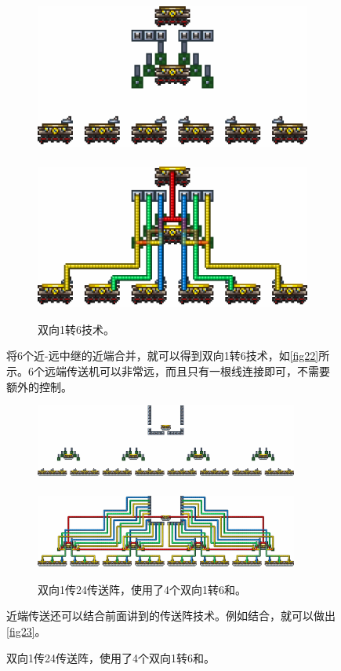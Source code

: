 \begin{figure}[!ht]
\begin{figure}[!ht]
\centering
\includegraphics{images/385.png}\\
\mbox{}\\
\includegraphics{images/386.png}
\caption{双向1转6技术。}\label{fig22}
\end{figure}
将6个近-远中继的近端合并，就可以得到双向1转6技术，如\autoref{fig22}所示。6个远端传送机可以非常远，而且只有一根线连接即可，不需要额外的控制。

\begin{figure}[!ht]
\centering
\includegraphics[width=0.95\textwidth]{images/387.png}\\
\mbox{}\\
\includegraphics[width=0.95\textwidth]{images/388.png}
\caption{双向1传24传送阵，使用了4个双向1转6和。}\label{fig23}
\end{figure}
近端传送还可以结合前面讲到的传送阵技术。例如结合，就可以做出\autoref{fig23}。


\end{figure}
